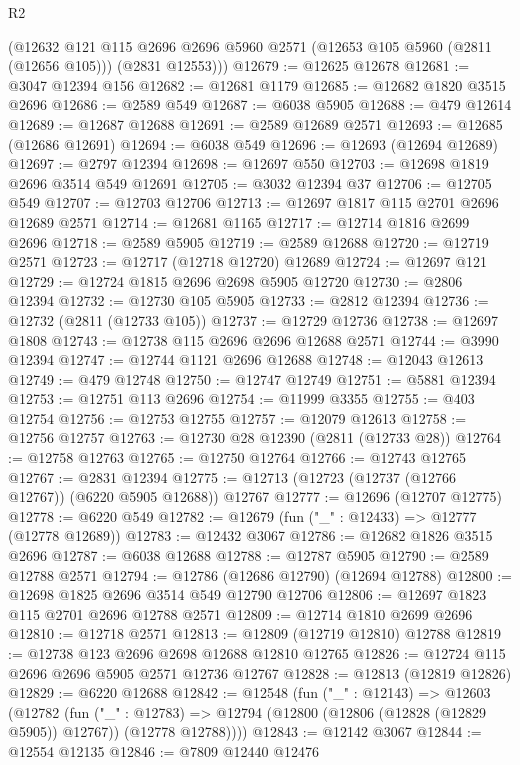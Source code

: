 \begin{lexlean}{R2}
\begin{coremodule}
      (@12632
        @121
        @115
        @2696
        @2696
        @5960
        @2571
        (@12653 @105 @5960 (@2811 (@12656 @105)))
        (@2831 @12553)))
@12679 := @12625 @12678
@12681 := @3047 @12394 @156
@12682 := @12681 @1179
@12685 := @12682 @1820 @3515 @2696
@12686 := @2589 @549
@12687 := @6038 @5905
@12688 := @479 @12614
@12689 := @12687 @12688
@12691 := @2589 @12689 @2571
@12693 := @12685 (@12686 @12691)
@12694 := @6038 @549
@12696 := @12693 (@12694 @12689)
@12697 := @2797 @12394
@12698 := @12697 @550
@12703 := @12698 @1819 @2696 @3514 @549 @12691
@12705 := @3032 @12394 @37
@12706 := @12705 @549
@12707 := @12703 @12706
@12713 := @12697 @1817 @115 @2701 @2696 @12689 @2571
@12714 := @12681 @1165
@12717 := @12714 @1816 @2699 @2696
@12718 := @2589 @5905
@12719 := @2589 @12688
@12720 := @12719 @2571
@12723 := @12717 (@12718 @12720) @12689
@12724 := @12697 @121
@12729 := @12724 @1815 @2696 @2698 @5905 @12720
@12730 := @2806 @12394
@12732 := @12730 @105 @5905
@12733 := @2812 @12394
@12736 := @12732 (@2811 (@12733 @105))
@12737 := @12729 @12736
@12738 := @12697 @1808
@12743 := @12738 @115 @2696 @2696 @12688 @2571
@12744 := @3990 @12394
@12747 := @12744 @1121 @2696 @12688
@12748 := @12043 @12613
@12749 := @479 @12748
@12750 := @12747 @12749
@12751 := @5881 @12394
@12753 := @12751 @113 @2696
@12754 := @11999 @3355
@12755 := @403 @12754
@12756 := @12753 @12755
@12757 := @12079 @12613
@12758 := @12756 @12757
@12763 := @12730 @28 @12390 (@2811 (@12733 @28))
@12764 := @12758 @12763
@12765 := @12750 @12764
@12766 := @12743 @12765
@12767 := @2831 @12394
@12775 := @12713 (@12723 (@12737 (@12766 @12767)) (@6220 @5905 @12688)) @12767
@12777 := @12696 (@12707 @12775)
@12778 := @6220 @549
@12782 := @12679 (fun ("_" : @12433) => @12777 (@12778 @12689))
@12783 := @12432 @3067
@12786 := @12682 @1826 @3515 @2696
@12787 := @6038 @12688
@12788 := @12787 @5905
@12790 := @2589 @12788 @2571
@12794 := @12786 (@12686 @12790) (@12694 @12788)
@12800 := @12698 @1825 @2696 @3514 @549 @12790 @12706
@12806 := @12697 @1823 @115 @2701 @2696 @12788 @2571
@12809 := @12714 @1810 @2699 @2696
@12810 := @12718 @2571
@12813 := @12809 (@12719 @12810) @12788
@12819 := @12738 @123 @2696 @2698 @12688 @12810 @12765
@12826 := @12724 @115 @2696 @2696 @5905 @2571 @12736 @12767
@12828 := @12813 (@12819 @12826)
@12829 := @6220 @12688
@12842 := @12548
    (fun ("_" : @12143) =>
    @12603
      (@12782
        (fun ("_" : @12783) =>
        @12794 (@12800 (@12806 (@12828 (@12829 @5905)) @12767)) (@12778 @12788))))
@12843 := @12142 @3067
@12844 := @12554 @12135
@12846 := @7809 @12440 @12476

\end{coremodule}
\end{lexlean}
